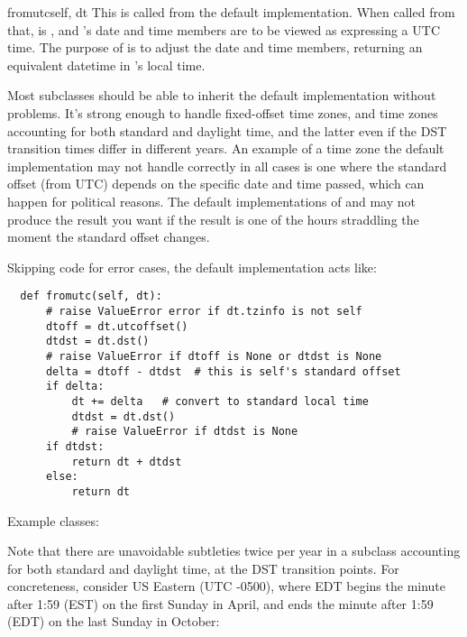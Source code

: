 \begin{methoddesc}{fromutc}{self, dt}
  This is called from the default 
  implementation.  When called from that,  is
  , and 's date and time members are to be viewed as
  expressing a UTC time.  The purpose of  is to
  adjust the date and time members, returning an equivalent datetime in
  's local time.

  Most  subclasses should be able to inherit the default
   implementation without problems.  It's strong enough
  to handle fixed-offset time zones, and time zones accounting for both
  standard and daylight time, and the latter even if the DST transition
  times differ in different years.  An example of a time zone the default
   implementation may not handle correctly in all cases
  is one where the standard offset (from UTC) depends on the specific date
  and time passed, which can happen for political reasons.
  The default implementations of  and
   may not produce the result you want if the result is
  one of the hours straddling the moment the standard offset changes.

  Skipping code for error cases, the default 
  implementation acts like:

  \begin{verbatim}
  def fromutc(self, dt):
      # raise ValueError error if dt.tzinfo is not self
      dtoff = dt.utcoffset()
      dtdst = dt.dst()
      # raise ValueError if dtoff is None or dtdst is None
      delta = dtoff - dtdst  # this is self's standard offset
      if delta:
          dt += delta   # convert to standard local time
          dtdst = dt.dst()
          # raise ValueError if dtdst is None
      if dtdst:
          return dt + dtdst
      else:
          return dt
  \end{verbatim}
\end{methoddesc}

Example  classes:



Note that there are unavoidable subtleties twice per year in a
subclass accounting for both standard and daylight time, at the DST
transition points.  For concreteness, consider US Eastern (UTC -0500),
where EDT begins the minute after 1:59 (EST) on the first Sunday in
April, and ends the minute after 1:59 (EDT) on the last Sunday in October:

